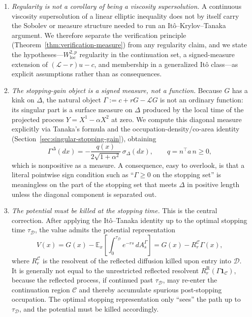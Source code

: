 \documentclass[pdflatex,sn-mathphys-num]{sn-jnl}
\theoremstyle{plain}
\theoremstyle{definition}
\begin{document}
\begin{enumerate}
\item[(i)]
\emph{Regularity is not a corollary of being a viscosity supersolution.}
A continuous viscosity supersolution of a linear elliptic inequality does not
by itself carry the Sobolev or measure structure needed to run an
It\^o--Krylov--Tanaka argument. We therefore separate the verification
principle (Theorem~\ref{thm:verification-measure}) from any regularity claim,
and we state the hypotheses---$W^{2,p}_{\mathrm{loc}}$ regularity in the
continuation set, a signed-measure extension of $(\mathcal L-r)u-c$, and
membership in a generalized It\^o class---as explicit assumptions rather than
as consequences.

\item[(ii)]
\emph{The stopping-gain object is a signed measure, not a function.}
Because $G$ has a kink on $\Delta$, the natural object
$\Gamma:=c+rG-\mathcal LG$ is not an ordinary function: its singular part is a
surface measure on $\Delta$ produced by the local time of the projected
process $Y=X^1-\alpha X^2$ at zero. We compute this diagonal measure
explicitly via Tanaka's formula and the occupation-density/co-area identity
(Section~\ref{sec:singular-stopping-gain}), obtaining
\[
   \Gamma^\Delta(dx)
   =-\frac{q(x)}{2\sqrt{1+\alpha^2}}\,\sigma_\Delta(dx),
   \qquad q=n^\top a\,n\ge0,
\]
which is nonpositive as a measure. A consequence, easy to overlook, is that a
literal pointwise sign condition such as ``$\Gamma\ge0$ on the stopping set''
is meaningless on the part of the stopping set that meets $\Delta$ in positive
length unless the diagonal component is separated out.

\item[(iii)]
\emph{The potential must be killed at the stopping time.}
This is the central correction. After applying the It\^o--Tanaka identity up
to the optimal stopping time $\tau_{\mathcal D}$, the value admits the
potential representation
\[
   V(x)=G(x)-\mathbb E_x\!\left[\int_0^{\tau_{\mathcal D}}e^{-rs}\,dA_s^\Gamma\right]
        =G(x)-R_r^{\mathcal C}\Gamma(x),
\]
where $R_r^{\mathcal C}$ is the resolvent of the reflected diffusion
killed upon entry into $\mathcal D$. It is generally not equal
to the unrestricted reflected resolvent $R_r^{\mathrm R}(\Gamma\mathbf 1_{\mathcal C})$,
because the reflected process, if continued past $\tau_{\mathcal D}$, may
re-enter the continuation region $\mathcal C$ and thereby accumulate spurious
post-stopping occupation. The optimal stopping representation only ``sees'' the
path up to $\tau_{\mathcal D}$, and the potential must be killed accordingly.
\end{enumerate}
\end{document}
